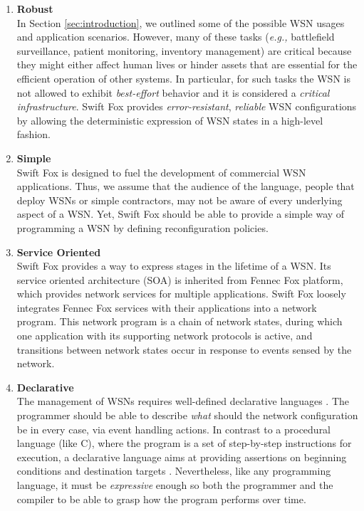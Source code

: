 \documentclass[11pt]{article}
\begin{document}
\begin{enumerate}
	\item \textbf{Robust}			\\
	In Section \ref{sec:introduction}, we outlined some of the
	possible WSN usages and application scenarios. However, many
	of these tasks (\textit{e.g.,} battlefield surveillance, patient
	monitoring, inventory management) are critical because they might 
	either affect human lives or hinder assets that are essential for
	the efficient operation of other systems. In particular, for
	such tasks the WSN is not allowed to exhibit \textit{best-effort}
	behavior and it is considered a \textit{critical infrastructure}.
	Swift Fox provides \textit{error-resistant}, \textit{reliable}
	WSN configurations by allowing the deterministic expression of WSN
	states in a high-level fashion.	
	
	\item \textbf{Simple}			\\
	Swift Fox is designed to fuel the development of commercial WSN
	applications. Thus, we assume that the audience of the language,
	people that deploy WSNs or simple contractors, may not be aware of
	every underlying aspect of a WSN. Yet, Swift Fox should be able to
	provide a simple way of programming a WSN by defining
	reconfiguration policies.

        \item \textbf{Service Oriented}       \\
	Swift Fox provides a way to express stages in the lifetime of
	a WSN. Its service oriented architecture (SOA) is inherited
	from Fennec Fox platform, which provides network services for
	multiple applications. Swift Fox loosely integrates Fennec Fox
	services with their applications into a network program. This
	network program is a chain of network states, during which one
	application with its supporting network protocols is active, and
	transitions between network states occur in response to events
	sensed by the network.   

	\item \textbf{Declarative}		\\
	The management of WSNs requires well-defined declarative languages
	\cite{hug90}. The programmer should be able to describe
	\textit{what} should the network configuration be in every case,
	via event handling actions. In contrast to a procedural language 
	(like C), where the program is a set of step-by-step instructions
	for execution, a declarative language aims at providing assertions 
	on beginning conditions and destination targets
	\cite{jinghuang:online}. Nevertheless, like any programming
	language, it must be \textit{expressive} enough so both the
	programmer and the compiler to be able to grasp how the program
	performs over time.


\end{enumerate}
\end{document}

